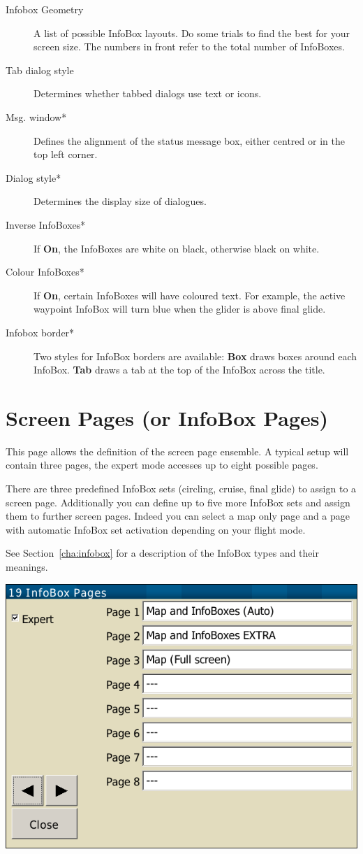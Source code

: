 \begin{description}
\item[Infobox Geometry]  A list of possible InfoBox layouts. Do some trials to find the 
  best for your screen size. The numbers in front refer to the total number of 
  InfoBoxes.
\item[Tab dialog style]  Determines whether tabbed dialogs use text or icons.
\item[Msg. window*]  Defines the alignment of the status message box, either 
  centred or in the top left corner.
\item[Dialog style*]  Determines the display size of dialogues.
\item[Inverse InfoBoxes*]  If {\bf On}, the InfoBoxes are white on black, otherwise 
  black on white.
\item[Colour InfoBoxes*]  If {\bf On}, certain InfoBoxes will have coloured text. For 
  example, the active waypoint InfoBox will turn blue when the glider is above final 
  glide.
\item[Infobox border*]  Two styles for InfoBox borders are available: {\bf Box} draws 
  boxes around each InfoBox. {\bf Tab} draws a tab at the top of the InfoBox across the 
  title.
\end{description}


\clearpage
\section{Screen Pages (or InfoBox Pages)}

This page allows the definition of the screen page ensemble. A typical setup will contain three pages, the expert mode accesses up to eight possible pages.

There are three predefined InfoBox sets (circling, cruise, final glide) to assign to a screen page. Additionally you can define up to five more InfoBox sets and assign them to further screen pages.  Indeed you can select a map only page and a page with automatic InfoBox set activation depending on your flight mode.

See Section~\ref{cha:infobox} for a description of the InfoBox types and their meanings.

\begin{center}
\includegraphics[angle=0,width=0.8\linewidth,keepaspectratio='true']{figures/config-pages.png}
\end{center}

